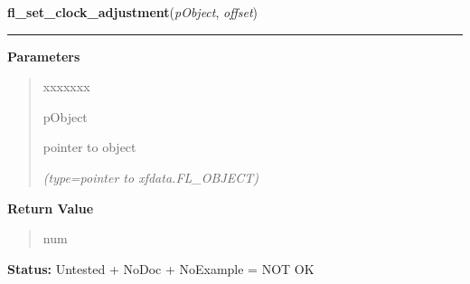     \vspace{0.5ex}

\hspace{.8\funcindent}\begin{boxedminipage}{\funcwidth}

    \raggedright \textbf{fl\_set\_clock\_adjustment}(\textit{pObject}, \textit{offset})

    \vspace{-1.5ex}

    \rule{\textwidth}{0.5\fboxrule}
\setlength{\parskip}{2ex}
\setlength{\parskip}{1ex}
      \textbf{Parameters}
      \vspace{-1ex}

      \begin{quote}
        \begin{Ventry}{xxxxxxx}

          \item[pObject]

          pointer to object

            {\it (type=pointer to xfdata.FL\_OBJECT)}

        \end{Ventry}

      \end{quote}

      \textbf{Return Value}
    \vspace{-1ex}

      \begin{quote}
      num

      \end{quote}

\textbf{Status:} Untested + NoDoc + NoExample = NOT OK



    \end{boxedminipage}

    \label{xformslib:library:fl_set_clock_ampm}

    \vspace{0.5ex}

